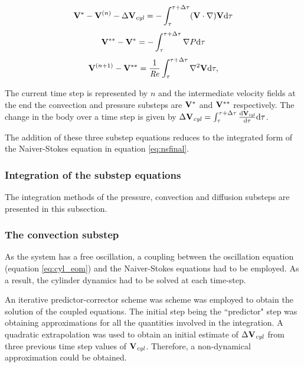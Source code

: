 \begin{equation} \centering
\label{eq:substep1}
\Vint - \Vn - \Delta\Vcyl = -\int_{\tau}^{\tau+\Delta\tau}(\vecV\cdot\nabla)\vecV \mathrm{d}\tau
\end{equation}
\begin{equation} \centering
\label{eq:substep2}
\Vintint - \Vint = -\int_{\tau}^{\tau+\Delta\tau}\nabla\Pres \mathrm{d}\tau
\end{equation}
\begin{equation} \centering
\label{eq:substep3}
\Vnext-\Vintint = \frac{1}{\Rey}\int_{\tau}^{\tau+\Delta\tau}\gradsq{\vecV} \mathrm{d}\tau,
\end{equation} 
 
The current time step is represented by $n$ and the intermediate velocity fields at the end the convection and pressure substeps are $\mathbf{V}^{*}$ and $\mathbf{V}^{**}$ respectively. The change in the body over a time step is given by $\Delta\mathbf{V}_{\mathit{cyl}} =
\int_{\tau}^{\tau+\Delta\tau}\frac{\mathrm{d}\mathbf{V}_{\mathit{cyl}}}{\mathrm{d}\tau} \mathrm{d}\tau$. 

The addition of these three substep equations reduces to the integrated form of the Naiver-Stokes equation in equation \ref{eq:nsfinal}. 

\subsubsection{Integration of the substep equations}
\label{subsec:sol}
 
 The integration methods of the pressure, convection and diffusion substeps are presented in this subsection. 
 
 \subsubsection{The convection substep}
 \label{subsub:convec}
 
As the system has a free oscillation, a coupling between the oscillation equation (equation \ref{eq:cyl_eom}) and the Naiver-Stokes equations had to be employed. As a result, the cylinder dynamics had to be solved at each time-step.

An iterative predictor-corrector scheme was scheme was employed to obtain the solution of the coupled equations. The initial step being the ``predictor" step was obtaining approximations for all the quantities involved in  the integration. A quadratic extrapolation was used to obtain an initial estimate of $\Delta\mathbf{V}_{\mathit{cyl}}$ from  three previous time step values of $\mathbf{V}_{\mathit{cyl}}$. Therefore, a non-dynamical approximation could be obtained.  
 
